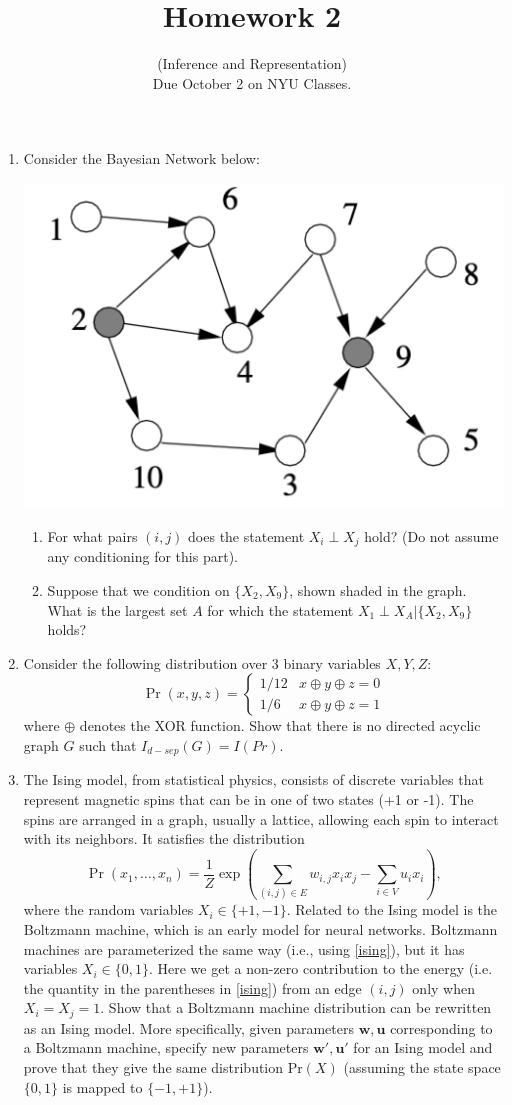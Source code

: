 \documentclass[11pt]{article}
\date{}
\title{Homework 2}
\author{(Inference and Representation) 
\\ Due October 2 on NYU Classes.  }
\begin{document}
\maketitle
 
\begin{enumerate}
\item Consider the Bayesian Network below:

\begin{center}
\includegraphics[width=.3\textwidth]{graph}
\end{center}
\begin{enumerate}
\item For what pairs $(i,j)$ does the statement $X_i \perp X_j$ hold? (Do not assume any conditioning for this part).
\item Suppose that we condition on $\{X_2, X_9\}$, shown shaded in the graph. What is the largest set $A$ for which the statement $X_1 \perp X_A | \{X_2, X_9\}$ holds? 
\end{enumerate}

\item Consider the following distribution over 3 binary variables $X,Y,Z:$
$$
\operatorname{Pr}(x,y,z)=\left\{ 
\begin{matrix}
1/12 & x \oplus y \oplus z =0 \\
1/6 & x \oplus y \oplus z =1 
\end{matrix}
\right.
$$
where $\oplus$ denotes the XOR function. Show that there is no directed acyclic graph $G$ such that $I_{d-sep}(G)= I(Pr)$.


\item The Ising model, from statistical physics, consists of discrete variables that represent magnetic spins that can be in one of two states (+1 or -1). The spins are arranged in a graph, usually a lattice, allowing each spin to interact with its neighbors. It satisfies the distribution
\begin{equation} \label{ising}
\operatorname{Pr}(x_1,\ldots, x_n)= \frac{1}{Z} \exp\left(\sum_{(i,j)\in E} w_{i,j}x_i x_j - \sum_{i\in V} u_i x_i \right),
\end{equation}
where the random variables $X_{i}\in \{+1, -1\}$. Related to the Ising model is the Boltzmann machine, which is an early model for neural networks. Boltzmann machines are parameterized the same way (i.e., using \eqref{ising}), but it has variables $X_i \in\{ 0, 1\}$. Here we get a non-zero contribution to the energy (i.e. the quantity in the parentheses in \eqref{ising}) from an edge $(i, j)$ only when $X_i = X_j = 1$.
Show that a Boltzmann machine distribution can be rewritten as an Ising model. More specifically, given parameters $\mathbf w, \mathbf u$ corresponding to a Boltzmann machine, specify new parameters $\mathbf{w'}, \mathbf {u'}$ for an Ising model and prove that they give the same distribution Pr$(X)$ (assuming the state space $\{0, 1\}$ is mapped to $\{-1, +1\}$).


\end{enumerate}
\end{document}
